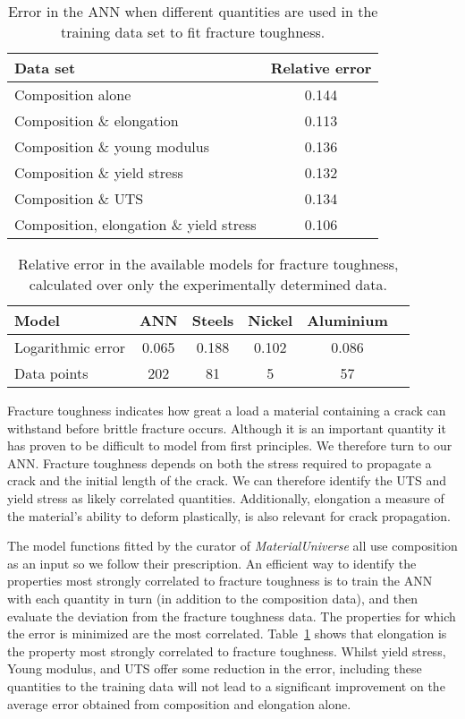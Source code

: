 \documentclass[review]{elsarticle}
\newcommand{\tabref}[1]{Table~\ref{#1}}
\begin{document}
\begin{table}
  \caption{Error in the ANN when different quantities are used 
    in the training data set to fit fracture toughness.}
\begin{tabular}{lc}
  \bf{Data set}&\bf{Relative error}\\
  \hline
  Composition alone&\num{0.144} \\
  Composition \& elongation& \num{0.113} \\
  Composition \& young modulus& \num{0.136} \\
  Composition \& yield stress& \num{0.132} \\
  Composition \& UTS&\num{0.134} \\
  Composition, elongation \& yield stress&\num{0.106}
\end{tabular}
  \label{tab:4-06-fracture-toughness-1}
\end{table}

\begin{table}
  \caption{Relative error in the available models for fracture 
    toughness, calculated over only the experimentally determined data.}
\begin{tabular}{lccccc}
  \bf{Model}&\bf{ANN}&\bf{Steels}&\bf{Nickel}&\bf{Aluminium}\\
  \hline
  Logarithmic error& \num{0.065} & \num{0.188} & 
  \num{0.102} & \num{0.086} \\
  Data points& \num{202} & \num{81} & \num{5} & \num{57}
\end{tabular}
  \label{tab:4-07-fracture-toughness-2}
\end{table}

Fracture toughness indicates how great a load a material containing a crack
can withstand before brittle fracture occurs. Although it is an important
quantity it has proven to be difficult to model from first principles. We
therefore turn to our ANN. Fracture toughness depends on both the stress
required to propagate a crack and the initial length of the crack. We can
therefore identify the UTS and yield stress as likely correlated quantities.
Additionally, elongation a measure of the material’s ability to deform
plastically, is also relevant for crack propagation.

The model functions fitted by the curator of \textit{MaterialUniverse} all
use composition as an input so we follow their prescription. An efficient
way to identify the properties most strongly correlated to fracture
toughness is to train the ANN with each quantity in turn (in addition to the
composition data), and then evaluate the deviation from the fracture
toughness data. The properties for which the error is minimized are the most
correlated.  \tabref{tab:4-06-fracture-toughness-1} shows that elongation is
the property most strongly correlated to fracture toughness. Whilst yield
stress, Young modulus, and UTS offer some reduction in the error, including
these quantities to the training data will not lead to a significant
improvement on the average error obtained from composition and elongation
alone.
\end{document}
